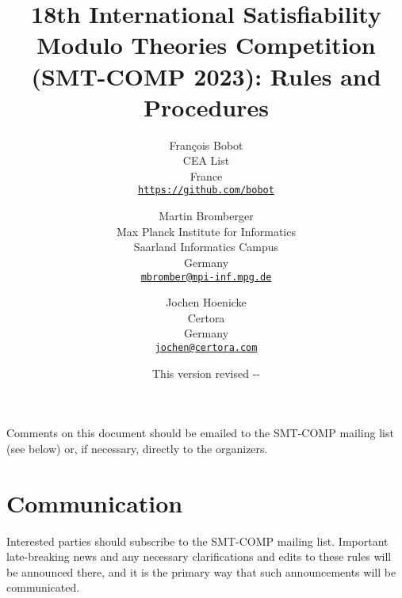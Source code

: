 \documentclass[12pt]{article}
\begin{document}
\date{\small This version revised \the\year-\the\month-\the\day}

\title{18th International Satisfiability Modulo Theories Competition
  (SMT-COMP 2023): Rules and Procedures}

\def\doauthor#1{{%
  \hsize.5\hsize \advance\hsize by-1cm %
  \def\\{\hss\egroup\hbox to\hsize\bgroup\strut\hss}%
  \vbox{\hbox to\hsize\bgroup\strut\hss#1\hss\egroup}}}%

\def\header#1{\medskip\noindent\textbf{#1}}

\author{%
Fran\c{c}ois Bobot\\
CEA List \\
France \\
{\small\href{mailto:Francois.BOBOT@cea.fr}{\texttt{https://github.com/bobot}}} \\
\and
Martin Bromberger\\
Max Planck Institute for Informatics\\
Saarland Informatics Campus\\
Germany\\
{\small\href{mailto:mbromber@mpi-inf.mpg.de}{\texttt{mbromber@mpi-inf.mpg.de}}}\\
\and
Jochen Hoenicke\\
Certora\\
Germany\\
{\small\href{mailto:jochen@certora.com}{\texttt{jochen@certora.com}}}
}

\maketitle

\noindent Comments on this document should be emailed to the SMT-COMP
mailing list (see below) or, if necessary, directly to the organizers.


\section{Communication}

Interested parties should subscribe to the SMT-COMP mailing list.
Important late-breaking news and any necessary clarifications and
edits to these rules will be announced there, and it is the primary
way that such announcements will be communicated.
\end{document}
